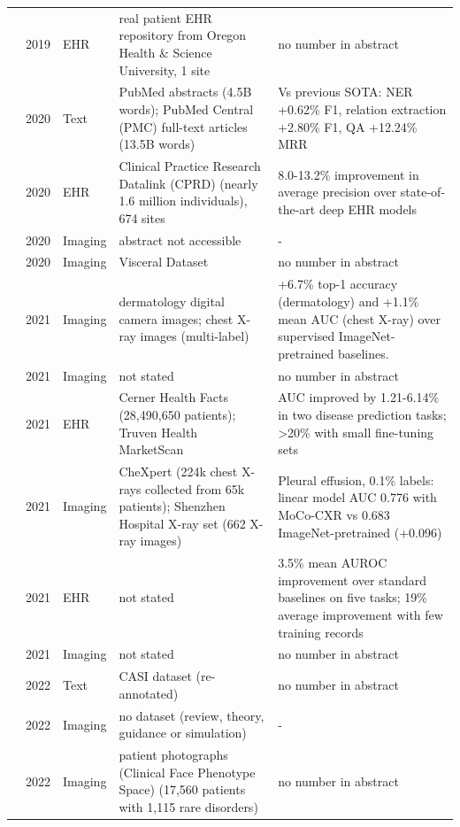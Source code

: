 \begin{longtable}{@{}p{2.6cm}p{0.7cm}p{1.2cm}p{4.4cm}p{4.6cm}@{}}
\cite{zhang2019metapred} & 2019 & EHR & real patient EHR repository from Oregon Health \& Science University, 1 site & no number in abstract\\
\cite{lee2020biobert} & 2020 & Text & PubMed abstracts (4.5B words); PubMed Central (PMC) full-text articles (13.5B words) & Vs previous SOTA: NER +0.62\% F1, relation extraction +2.80\% F1, QA +12.24\% MRR\\
\cite{li2020behrt} & 2020 & EHR & Clinical Practice Research Datalink (CPRD) (nearly 1.6 million individuals), 674 sites & 8.0-13.2\% improvement in average precision over state-of-the-art deep EHR models\\
\cite{mahajan2020meta} & 2020 & Imaging & abstract not accessible & -\\
\cite{roy2020squeeze} & 2020 & Imaging & Visceral Dataset & no number in abstract\\
\cite{azizi2021big} & 2021 & Imaging & dermatology digital camera images; chest X-ray images (multi-label) & +6.7\% top-1 accuracy (dermatology) and +1.1\% mean AUC (chest X-ray) over supervised ImageNet-pretrained baselines.\\
\cite{huang2021gloria} & 2021 & Imaging & not stated & no number in abstract\\
\cite{rasmy2021med} & 2021 & EHR & Cerner Health Facts (28,490,650 patients); Truven Health MarketScan & AUC improved by 1.21-6.14\% in two disease prediction tasks; >20\% with small fine-tuning sets\\
\cite{sowrirajan2021moco} & 2021 & Imaging & CheXpert (224k chest X-rays collected from 65k patients); Shenzhen Hospital X-ray set (662 X-ray images) & Pleural effusion, 0.1\% labels: linear model AUC 0.776 with MoCo-CXR vs 0.683 ImageNet-pretrained (+0.096)\\
\cite{steinberg2021language} & 2021 & EHR & not stated & 3.5\% mean AUROC improvement over standard baselines on five tasks; 19\% average improvement with few training records\\
\cite{zhou2021models} & 2021 & Imaging & not stated & no number in abstract\\
\cite{agrawal2022large} & 2022 & Text & CASI dataset (re-annotated) & no number in abstract\\
\cite{guan2022domain} & 2022 & Imaging & no dataset (review, theory, guidance or simulation) & -\\
\cite{hsieh2022gestaltmatcher} & 2022 & Imaging & patient photographs (Clinical Face Phenotype Space) (17,560 patients with 1,115 rare disorders) & no number in abstract\\

\end{longtable}
